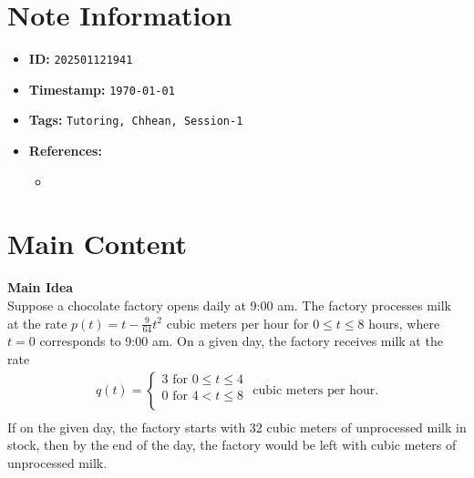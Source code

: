 \clearpage
{}
\label{202501121941}
\renewcommand{\notetitle}{Question 7}

\section*{Note Information}
\begin{itemize}
  \item \textbf{ID:} \texttt{202501121941}
  \item \textbf{Timestamp:} \texttt{\today \ \currenttime}
  \item \textbf{Tags:} \texttt{Tutoring, Chhean, Session-1}
  \item \textbf{References:}
    \begin{itemize}
      \item \href{}{}
    \end{itemize}
\end{itemize}


\section*{Main Content}
\textbf{Main Idea}\\
Suppose a chocolate factory opens daily at 9:00 am.
The factory processes milk at the rate $p(t) = t - \frac{9}{64}t^2$ cubic meters per hour for $0 \leq t \leq 8$ hours, where $t = 0$ corresponds to 9:00 am. 
On a given day, the factory receives milk at the rate
\begin{align*}
  q(t) = \begin{cases}
    3 \text{ for } 0 \leq t \leq 4\\
    0 \text{ for } 4 < t \leq 8\\
  \end{cases} \text{ cubic meters per hour.}\\
\end{align*}
If on the given day, the factory starts with 32 cubic meters of unprocessed milk in stock, then by the end of the day, the factory would be left with cubic meters of unprocessed milk.\\

